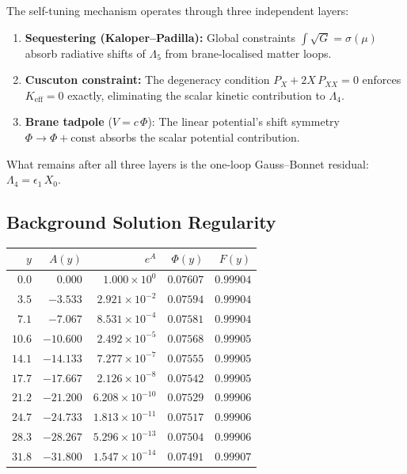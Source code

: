 The self-tuning mechanism operates through three independent layers:
\begin{enumerate}
\item \textbf{Sequestering (Kaloper--Padilla):} Global constraints $\int\!\sqrt{G} = \sigma(\mu)$ absorb radiative shifts of $\Lambda_5$ from brane-localised matter loops.
\item \textbf{Cuscuton constraint:} The degeneracy condition $P_X + 2X\,P_{XX} = 0$ enforces $K_{\mathrm{eff}} = 0$ exactly, eliminating the scalar kinetic contribution to $\Lambda_4$.
\item \textbf{Brane tadpole} ($V = c\,\Phi$): The linear potential's shift symmetry $\Phi \to \Phi + \text{const}$ absorbs the scalar potential contribution.
\end{enumerate}
What remains after all three layers is the one-loop Gauss--Bonnet residual: $\Lambda_4 = \epsilon_1\,X_0$.

\subsection{Background Solution Regularity}

\begin{center}
\begin{tabular}{r r r r r}
\hline
$y$ & $A(y)$ & $e^{A}$ & $\Phi(y)$ & $F(y)$ \\
\hline
$0.0$ & $0.000$ & $1.000 \times 10^{0}$ & $0.07607$ & $0.99904$ \\
$3.5$ & $-3.533$ & $2.921 \times 10^{-2}$ & $0.07594$ & $0.99904$ \\
$7.1$ & $-7.067$ & $8.531 \times 10^{-4}$ & $0.07581$ & $0.99904$ \\
$10.6$ & $-10.600$ & $2.492 \times 10^{-5}$ & $0.07568$ & $0.99905$ \\
$14.1$ & $-14.133$ & $7.277 \times 10^{-7}$ & $0.07555$ & $0.99905$ \\
$17.7$ & $-17.667$ & $2.126 \times 10^{-8}$ & $0.07542$ & $0.99905$ \\
$21.2$ & $-21.200$ & $6.208 \times 10^{-10}$ & $0.07529$ & $0.99906$ \\
$24.7$ & $-24.733$ & $1.813 \times 10^{-11}$ & $0.07517$ & $0.99906$ \\
$28.3$ & $-28.267$ & $5.296 \times 10^{-13}$ & $0.07504$ & $0.99906$ \\
$31.8$ & $-31.800$ & $1.547 \times 10^{-14}$ & $0.07491$ & $0.99907$ \\
\hline
\end{tabular}
\end{center}


